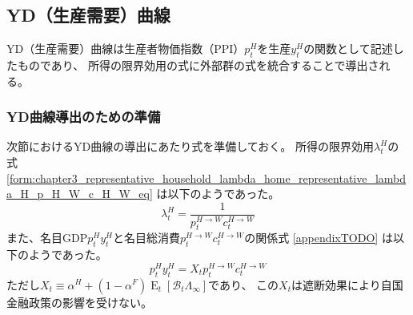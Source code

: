 
\subsection{YD（生産需要）曲線}
\label{sec:chapter5_two_plane_yd}
YD（生産需要）曲線は生産者物価指数（PPI）\(p_t^H\)を生産\(y_t^H\)の関数として記述したものであり、
所得の限界効用の式に外部群の式を統合することで導出される。

\subsubsection{YD曲線導出のための準備}
\label{sec:chapter5_two_plane_yd_preparation}
次節におけるYD曲線の導出にあたり式を準備しておく。
所得の限界効用\(\lambda_t^H\)の式
\eqref{form:chapter3_representative_household_lambda_home_representative_lambda_H_p_H_W_c_H_W_eq}
は以下のようであった。
\begin{equation}
\label{form:chapter5_two_plane_yd_preparation_lambda_H_p_H_W_c_H_W_eq}
    \lambda_t^H=\frac{1}{p_t^{H\to W}c_t^{H\to W}}
\end{equation}
また、名目GDP\(p_t^Hy_t^H\)と名目総消費\(p_t^{H\to W}c_t^{H\to W}\)の関係式
\eqref{appendixTODO}
は以下のようであった。
\begin{equation}
\label{form:chapter5_two_plane_yd_preparation_p_H_y_H_eq}
    p_t^Hy_t^H=X_tp_t^{H\to W}c_t^{H\to W}
\end{equation}
ただし\(X_t\equiv\alpha^H+(1-\alpha^F)\operatorname{E}_t[\mathcal{B}_t\Lambda_{\infty}]\)であり、
この\(X_t\)は遮断効果により自国金融政策の影響を受けない。

